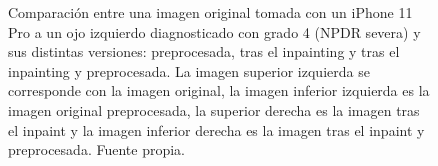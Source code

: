 \begin{figure}[!t]
\caption{Comparación entre una imagen original tomada con un iPhone 11 Pro a un ojo izquierdo diagnosticado con grado 4 (NPDR severa) y sus distintas versiones: preprocesada, tras el inpainting y tras el inpainting y preprocesada. La imagen superior izquierda se corresponde con la imagen original, la imagen inferior izquierda es la imagen original preprocesada, la superior derecha es la imagen tras el inpaint y la imagen inferior derecha es la imagen tras el inpaint y preprocesada. Fuente propia.}
\label{fig:inp}
\end{figure}